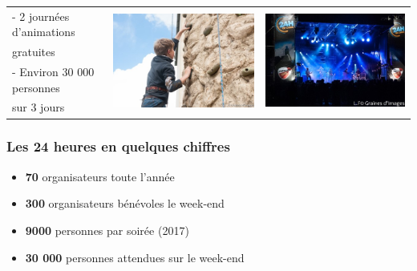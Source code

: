 \documentclass{beamer}
\begin{document}
\begin{frame}
\begin{tabular}{lcc}
- 2 journées d'animations & \multirow{4}{*}{\centering\includegraphics[height=.2\textheight]{Images/Image3}} & \multirow{4}{*}{\centering\includegraphics[height=.2\textheight]{Images/Image4}}\\
gratuites&\\
- Environ 30 000 personnes&\\
sur 3 jours &\\
	
\end{tabular}

\end{frame}

\begin{frame}

\frametitle{Les 24 heures en quelques chiffres}

\begin{itemize}
\item \textbf{70} organisateurs toute l'année
\item \textbf{300} organisateurs bénévoles le week-end
\item \textbf{9000} personnes par soirée (2017)
\item \textbf{30 000} personnes attendues sur le week-end
\end{itemize}

\end{frame}
\end{document}
